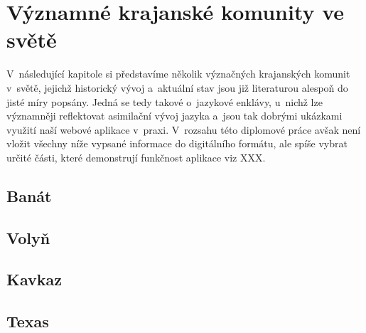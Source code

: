 \hypertarget{vuxfdznamnuxe9-krajanskuxe9-komunity-ve-svux11btux11b}{%
\chapter{Významné krajanské komunity ve světě}\label{vuxfdznamnuxe9-krajanskuxe9-komunity-ve-svux11btux11b}}

V~následující kapitole si představíme několik význačných krajanských komunit v~světě, jejichž historický vývoj a~aktuální stav jsou již literaturou alespoň do jisté míry popsány. Jedná se tedy takové o~jazykové enklávy, u~nichž lze významněji reflektovat asimilační vývoj jazyka a~jsou tak dobrými ukázkami využití naší webové aplikace v~praxi. V~rozsahu této diplomové práce avšak není vložit všechny níže vypsané informace do digitálního formátu, ale spíše vybrat určité části, které demonstrují funkčnost aplikace viz XXX.

\hypertarget{banuxe1t}{%
\section{Banát}\label{banuxe1t}}

\hypertarget{volyux148}{%
\section{Volyň}\label{volyux148}}

\hypertarget{kavkaz}{%
\section{Kavkaz}\label{kavkaz}}

\hypertarget{texas}{%
\section{Texas}\label{texas}}

